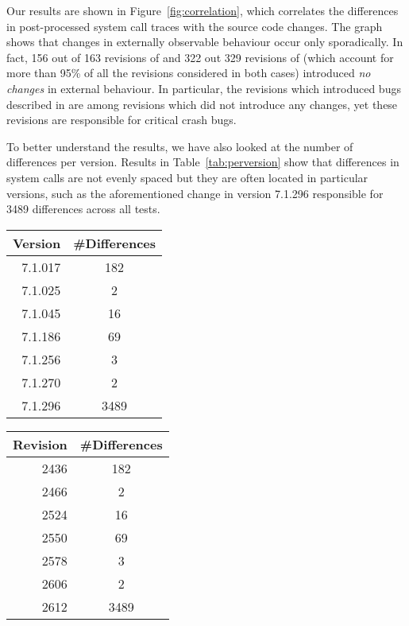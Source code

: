 Our results are shown in Figure~\ref{fig:correlation}, which correlates the
differences in post-processed system call traces with the source code changes.
The graph shows that changes in externally observable behaviour occur only
sporadically.  In fact, 156 out of 163 revisions of \lighttpd and 322 out 329
revisions of \vim (which account for more than 95\% of all the revisions
considered in both cases) introduced \textit{no changes} in external behaviour.
In particular, the revisions which introduced bugs described in
 are among revisions which did not introduce any
changes, yet these revisions are responsible for critical crash bugs.

To better understand the results, we have also looked at the number of
differences per version. Results in Table~\ref{tab:perversion} show that
differences in system calls are not evenly spaced but they are often located
in particular versions, such as the aforementioned change in version 7.1.296
responsible for 3489 differences across all tests.

\begin{table}
  \centering
  \begin{tabular}{r @{\qquad}c}
    \toprule
    Version & \#Differences \\
    \midrule
    7.1.017 & 182 \\
    7.1.025 & 2 \\
    7.1.045 & 16 \\
    7.1.186 & 69 \\
    7.1.256 & 3 \\
    7.1.270 & 2 \\
    7.1.296 & 3489 \\
    \bottomrule
  \end{tabular}
\end{table}

\begin{table}
  \centering
  \begin{tabular}{r @{\qquad}c}
    \toprule
    Revision & \#Differences \\
    \midrule
    2436 & 182 \\
    2466 & 2 \\
    2524 & 16 \\
    2550 & 69 \\
    2578 & 3 \\
    2606 & 2 \\
    2612 & 3489 \\
    \bottomrule
  \end{tabular}
\end{table}


